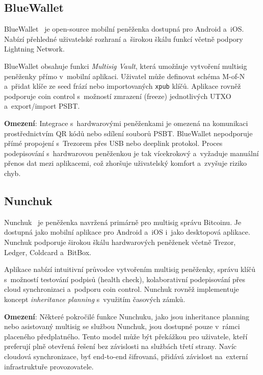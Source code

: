 \subsection{BlueWallet}
\label{sec:bluewallet}

BlueWallet~\citep{BlueWallet} je open-source mobilní peněženka dostupná pro
Android a~iOS. Nabízí přehledné uživatelské rozhraní a~širokou škálu funkcí
včetně podpory Lightning Network.

BlueWallet obsahuje funkci \emph{Multisig Vault}, která umožňuje vytvoření
multisig peněženky přímo v~mobilní aplikaci. Uživatel může definovat schéma
M-of-N a~přidat klíče ze seed frází nebo importovaných \texttt{xpub} klíčů.
Aplikace rovněž podporuje coin control s~možností zmrazení (freeze) jednotlivých
UTXO a~export/import PSBT.

\textbf{Omezení}: Integrace s~hardwarovými peněženkami je omezená na komunikaci
prostřednictvím QR kódů nebo sdílení souborů PSBT. BlueWallet nepodporuje
přímé propojení s~Trezorem přes USB nebo deeplink protokol. Proces podepisování
s~hardwarovou peněženkou je tak vícekrokový a~vyžaduje manuální přenos dat
mezi aplikacemi, což zhoršuje uživatelský komfort a~zvyšuje riziko chyb.

\subsection{Nunchuk}
\label{sec:nunchuk}

Nunchuk~\citep{Nunchuk} je peněženka navržená primárně pro multisig správu
Bitcoinu. Je dostupná jako mobilní aplikace pro Android a~iOS i~jako desktopová
aplikace. Nunchuk podporuje širokou škálu hardwarových peněženek včetně Trezor,
Ledger, Coldcard a~BitBox.

Aplikace nabízí intuitivní průvodce vytvořením multisig peněženky, správu
klíčů s~možností testování podpisů (health check), kolaborativní podepisování
přes cloud synchronizaci a~podporu coin control. Nunchuk rovněž implementuje
koncept \emph{inheritance planning} s~využitím časových zámků.

\textbf{Omezení}: Některé pokročilé funkce Nunchuku, jako jsou inheritance
planning nebo asistovaný multisig se službou Nunchuk, jsou dostupné pouze
v~rámci placeného předplatného. Tento model může být překážkou pro uživatele,
kteří preferují plně otevřená řešení bez závislosti na službách třetí strany.
Navíc cloudová synchronizace, byť end-to-end šifrovaná, přidává závislost
na~externí infrastruktuře provozovatele.

